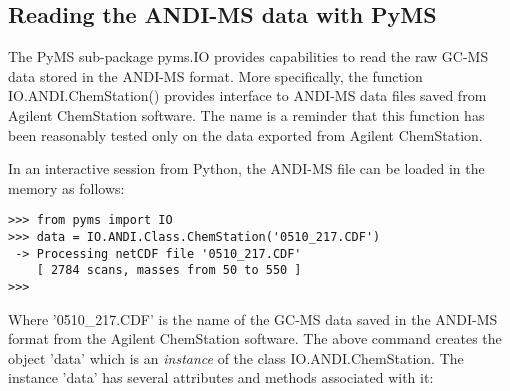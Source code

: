 \subsection{Reading the ANDI-MS data with PyMS}

The PyMS sub-package pyms.IO provides capabilities to read the raw GC-MS
data stored in the ANDI-MS format. More specifically, the function
IO.ANDI.ChemStation() provides interface to ANDI-MS data files saved
from Agilent ChemStation software. The name is a reminder that this
function has been reasonably tested only on the data exported from
Agilent ChemStation.

In an interactive session from Python, the ANDI-MS file can be loaded
in the memory as follows:

\begin{verbatim}
>>> from pyms import IO
>>> data = IO.ANDI.Class.ChemStation('0510_217.CDF')
 -> Processing netCDF file '0510_217.CDF'
    [ 2784 scans, masses from 50 to 550 ]
>>>
\end{verbatim}

Where '0510\_217.CDF' is the name of the GC-MS data saved in the ANDI-MS
format from the Agilent ChemStation software.  The above command creates
the object 'data' which is an {\em instance} of the class IO.ANDI.ChemStation.
The instance 'data' has several attributes and methods associated with it:

